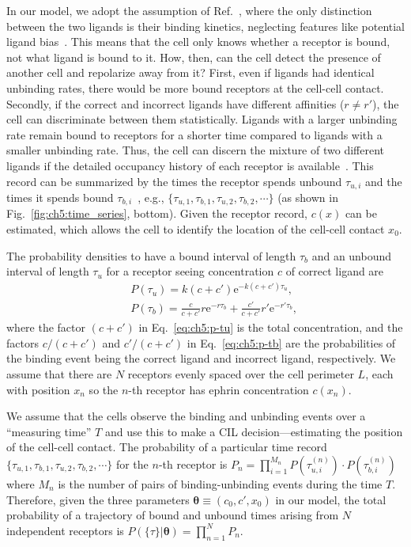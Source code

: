 In our model, we adopt the assumption of Ref.~\cite{mora2015physical}, where the only distinction between the two ligands is their binding kinetics, neglecting features like potential ligand bias~\cite{karl2020ligand, gomez2022ligands}.
This means that the cell only knows whether a receptor is bound, not what ligand is bound to it.
How, then, can the cell detect the presence of another cell and repolarize away from it?
First, even if ligands had identical unbinding rates, there would be more bound receptors at the cell-cell contact.
Secondly, if the correct and incorrect ligands have different affinities ($r \neq r'$), the cell can discriminate between them statistically.
Ligands with a larger unbinding rate remain bound to receptors for a shorter time compared to ligands with a smaller unbinding rate.
Thus, the cell can discern the mixture of two different ligands if the detailed occupancy history of each receptor is available~\cite{mora2015physical}.
This record can be summarized by the times the receptor spends unbound $\tau_{u,i}$ and the times it spends bound $\tau_{b,i}$~\cite{mora2010limits, mora2015physical, endres2009maximum}, e.g., $\{\tau_{u,1},\tau_{b,1},\tau_{u,2},\tau_{b,2},\cdots\}$ (as shown in Fig.~\ref{fig:ch5:time_series}, bottom).
Given the receptor record, $c(x)$ can be estimated, which allows the cell to identify the location of the cell-cell contact $x_0$.

The probability densities to have a bound interval of length $\tau_b$ and an unbound interval of length $\tau_u$ for a receptor seeing concentration $c$ of correct ligand are~\cite{mora2015physical, hopkins2020chemotaxis}
\begin{eqnarray}
    &&P(\tau_u)=k(c+c')\mathrm{e}^{-k(c+c')\tau_u},\label{eq:ch5:p-tu}\\
    &&P(\tau_b)=\frac{c}{c+c'}r\mathrm{e}^{-r\tau_b} + \frac{c'}{c+c'}r'\mathrm{e}^{-r'\tau_b},\label{eq:ch5:p-tb}
\end{eqnarray}
where the factor $(c+c')$ in Eq.~\eqref{eq:ch5:p-tu} is the total concentration, and the factors $c/(c+c')$ and $c'/(c+c')$ in Eq.~\eqref{eq:ch5:p-tb} are the probabilities of the binding event being the correct ligand and incorrect ligand, respectively.
We assume that there are $N$ receptors evenly spaced over the cell perimeter $L$, each with position $x_n$ so the $n$-th receptor has ephrin concentration $c(x_n)$.

We assume that the cells observe the binding and unbinding events over a ``measuring time'' $T$ and use this to make a CIL decision---estimating the position of the cell-cell contact.
The probability of a particular time record $\{\tau_{u,1},\tau_{b,1},\tau_{u,2},\tau_{b,2},\cdots\}$ for the $n$-th receptor is $P_n=\prod_{i=1}^{M_n}P(\tau_{u,i}^{(n)})\cdot P(\tau_{b,i}^{(n)})$ where $M_n$ is the number of pairs of binding-unbinding events during the time $T$.
Therefore, given the three parameters $\boldsymbol{\theta}\equiv(c_0, c', x_0)$ in our model, the total probability of a trajectory of bound and unbound times arising from $N$ independent receptors is $P(\{\tau\}|\boldsymbol{\theta})=\prod_{n=1}^N P_n$.


